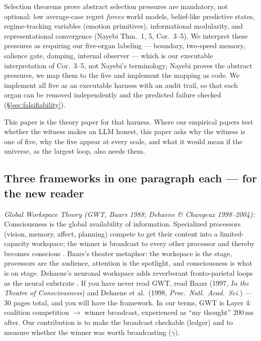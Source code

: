 \documentclass[11pt]{article}
\begin{document}
Selection theorems \citep{nayebi2026} prove abstract selection pressures are mandatory, not optional: low average-case regret \emph{forces} world models, belief-like predictive states, regime-tracking variables (emotion primitives), informational modularity, and representational convergence (Nayebi Thm.~1, 5, Cor.~3--5). We interpret these pressures as requiring our five-organ labeling --- boundary, two-speed memory, salience gate, damping, internal observer --- which is our executable interpretation of Cor.~3--5, not Nayebi's terminology; Nayebi proves the abstract pressures, we map them to the five and implement the mapping as code. We implement all five as an executable harness with an audit trail, so that each organ can be removed independently and the predicted failure checked (\S\ref{sec:falsifiability}).

This paper is the theory paper for that harness. Where our empirical papers \citep{paper-v2-final,paper-v3} test whether the witness makes an LLM honest, this paper asks why the witness is one of five, why the five appear at every scale, and what it would mean if the universe, as the largest loop, also needs them.

\subsection*{Three frameworks in one paragraph each --- for the new reader}

\textit{Global Workspace Theory (GWT, Baars 1988; Dehaene \& Changeux 1998--2004):} Consciousness is the global availability of information. Specialized processors (vision, memory, affect, planning) compete to get their content into a limited-capacity workspace; the winner is broadcast to every other processor and thereby becomes conscious \citep{baars1997,atallah2026gwt}. Baars's theater metaphor: the workspace is the stage, processors are the audience, attention is the spotlight, and consciousness is what is on stage. Dehaene's neuronal workspace adds reverberant fronto-parietal loops as the neural substrate \citep{atallah2026gwt}. If you have never read GWT, read Baars (1997, \emph{In the Theatre of Consciousness}) and Dehaene et al.\ (1998, \emph{Proc.\ Natl.\ Acad.\ Sci.}) --- 30 pages total, and you will have the framework. In our terms, GWT is Layer 4: coalition competition $\to$\allowbreak{} winner broadcast, experienced as ``my thought'' 200\,ms after. Our contribution is to make the broadcast checkable (ledger) and to measure whether the winner was worth broadcasting ($\gamma$).
\end{document}
